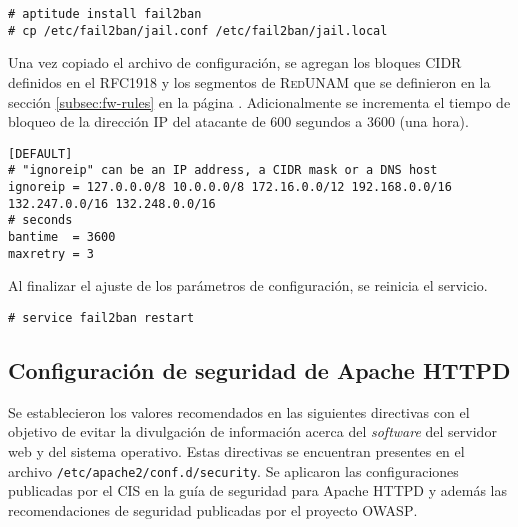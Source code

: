 {
\scriptsize
\linespread{1}
\begin{verbatim}
# aptitude install fail2ban
# cp /etc/fail2ban/jail.conf /etc/fail2ban/jail.local
\end{verbatim}
}

Una vez copiado el archivo de configuraci\'{o}n, se agregan los bloques \textsc{CIDR} definidos en el \textsc{RFC1918} y los segmentos de \textsc{RedUNAM} que se definieron en la secci\'{o}n \ref{subsec:fw-rules} en la p\'{a}gina \pageref{subsec:fw-rules}. Adicionalmente se incrementa el tiempo de bloqueo de la direcci\'{o}n IP del atacante de 600 segundos a 3600 (una hora).

{
\scriptsize
\linespread{1}
\begin{verbatim}
[DEFAULT]
# "ignoreip" can be an IP address, a CIDR mask or a DNS host
ignoreip = 127.0.0.0/8 10.0.0.0/8 172.16.0.0/12 192.168.0.0/16 132.247.0.0/16 132.248.0.0/16
# seconds
bantime  = 3600
maxretry = 3
\end{verbatim}
}

Al finalizar el ajuste de los par\'{a}metros de configuraci\'{o}n, se reinicia el servicio.

{
\scriptsize
\linespread{1}
\begin{verbatim}
# service fail2ban restart
\end{verbatim}
}

      \subsection {Configuraci\'{o}n de seguridad de Apache \textsc{HTTPD}}

Se establecieron los valores recomendados en las siguientes directivas con el objetivo de evitar la divulgaci\'{o}n de informaci\'{o}n acerca del \textit{software} del servidor web y del sistema operativo. Estas directivas se encuentran presentes en el archivo \texttt{/etc/apache2/conf.d/security}. Se aplicaron las configuraciones publicadas por el \textsc{CIS} en la gu\'{i}a de seguridad para Apache \textsc{HTTPD}\cite{_microsoft_????-1} y adem\'{a}s las recomendaciones de seguridad publicadas por el proyecto \textsc{OWASP}\cite{_scg_????}.

{
 \begin{table}[H]
 \caption{Directivas de seguridad de Apache \textsc{HTTPD}}{}
 \label{tab:apache-hardening}
 \noindent{} %
 \end{table}
}

